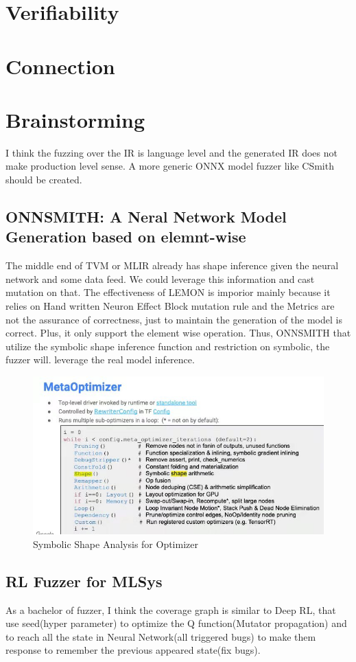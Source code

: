 \documentclass[conference]{IEEEtran}
\begin{document}
\section{Verifiability}


\section{Connection}

\section{Brainstorming}
I think the fuzzing over the IR is language level and the generated IR does not make production level sense. A more generic ONNX model fuzzer like CSmith should be created.
\subsection{ONNSMITH: A Neral Network Model Generation based on elemnt-wise}
The middle end of TVM or MLIR already has shape inference given the neural network and some data feed. We could leverage this information and cast mutation on that. The effectiveness of LEMON is imporior mainly because it relies on Hand written Neuron Effect Block mutation rule and the Metrics are not the assurance of correctness, just to maintain the generation of the model is correct. Plus, it only support the element wise operation.
Thus, ONNSMITH that utilize the symbolic shape inference function and restriction on symbolic, the fuzzer will. leverage the real model inference.
\begin{figure}[htbp]
    \centering
    \includegraphics[width=\columnwidth]{./WechatIMG15.jpeg}
    \caption{Symbolic Shape Analysis for Optimizer}
  \end{figure}
  \subsection{RL Fuzzer for MLSys}
As a bachelor of fuzzer, I think the coverage graph is similar to Deep RL, that use seed(hyper parameter) to optimize the Q function(Mutator propagation) and to reach all the state in Neural Network(all triggered bugs) to make them response to remember the previous appeared state(fix bugs).
\end{document}
